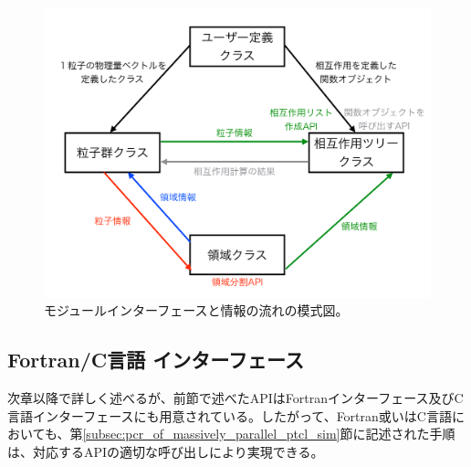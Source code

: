 \begin{figure}[h]
\centering
\includegraphics[width=0.75\linewidth]{./fig/illustration/illustration.pdf}
\caption{モジュールインターフェースと情報の流れの模式図。}
\label{fig:brief_interface}
\end{figure}

\subsection{Fortran/C言語 インターフェース}
次章以降で詳しく述べるが、前節で述べたAPIはFortranインターフェース及びC言語インターフェースにも用意されている。したがって、Fortran或いはC言語においても、第\ref{subsec:pcr_of_massively_parallel_ptcl_sim}節に記述された手順は、対応するAPIの適切な呼び出しにより実現できる。


